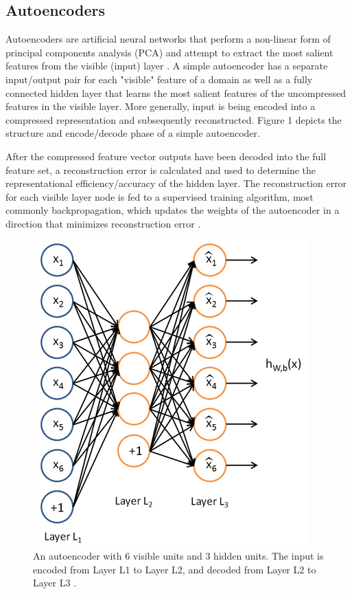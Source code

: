 \documentclass{acm_proc_article-sp}
\begin{document}
\subsection{Autoencoders}
Autoencoders are artificial neural networks that perform a non-linear form of principal components analysis (PCA) and attempt to extract the most salient features from the visible (input) layer \cite{bourland1988, baldi2012autoencoders}.  A simple autoencoder has a separate input/output pair for each "visible" feature of a domain as well as a fully connected hidden layer that learns the most salient features of the uncompressed features in the visible layer.  More generally, input is being encoded into a compressed representation and subsequently reconstructed.  Figure 1 depicts the structure and encode/decode phase of a simple autoencoder.

After the compressed feature vector outputs have been decoded into the full feature set, a reconstruction error is calculated and used to determine the representational efficiency/accuracy of the hidden layer.  The reconstruction error for each visible layer node is fed to a supervised training algorithm, most commonly backpropagation, which updates the weights of the autoencoder in a direction that minimizes reconstruction error \cite{stanfordimage}.

\begin{figure}[h]
\caption{An autoencoder with 6 visible units and 3 hidden units.  The input is encoded from Layer L1 to Layer L2, and decoded from Layer L2 to Layer L3 \cite{stanfordimage}.}
\centering
\includegraphics[scale=0.8]{ExampleAutoencoder}
\end{figure}
\end{document}
